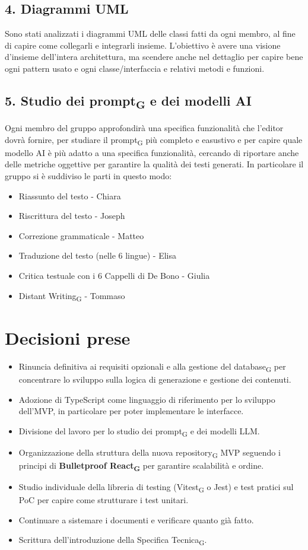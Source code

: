 \documentclass[a4paper,12pt]{article}
\newcommand{\gls}[1]{#1\textsubscript{G}}
\begin{document}
\subsection*{4. Diagrammi UML}
Sono stati analizzati i diagrammi UML delle classi fatti da ogni membro, al fine di capire come collegarli e integrarli insieme. L'obiettivo è avere una visione d'insieme dell'intera architettura, ma scendere anche nel dettaglio per capire bene ogni pattern usato e ogni classe/interfaccia e relativi metodi e funzioni.

\subsection*{5. Studio dei \gls{prompt} e dei modelli AI}
Ogni membro del gruppo approfondirà una specifica funzionalità che l'editor dovrà fornire, per studiare il \gls{prompt} più completo e easustivo e per capire quale modello AI è più adatto a una specifica funzionalità, cercando di riportare anche delle metriche oggettive per garantire la qualità dei testi generati. In particolare il gruppo si è suddiviso le parti in questo modo:
\begin{itemize}
    \item Riassunto del testo - Chiara
    \item Riscrittura del testo - Joseph
    \item Correzione grammaticale - Matteo
    \item Traduzione del testo (nelle 6 lingue) - Elisa
    \item Critica testuale con i 6 Cappelli di De Bono - Giulia
    \item \gls{Distant Writing} - Tommaso
\end{itemize}


\section*{Decisioni prese}
\begin{itemize}
    \item Rinuncia definitiva ai requisiti opzionali e alla gestione del \gls{database} per concentrare lo sviluppo sulla logica di generazione e gestione dei contenuti.
    \item Adozione di TypeScript come linguaggio di riferimento per lo sviluppo dell'MVP, in particolare per poter implementare le interfacce.
    \item Divisione del lavoro per lo studio dei \gls{prompt} e dei modelli LLM.
    \item Organizzazione della struttura della nuova \gls{repository} MVP seguendo i principi di \textbf{Bulletproof \gls{React}} per garantire scalabilità e ordine.
    \item Studio individuale della libreria di testing (\gls{Vitest} o Jest) e test pratici sul PoC per capire come strutturare i test unitari.
    \item Continuare a sistemare i documenti e verificare quanto già fatto.
    \item Scrittura dell'introduzione della \gls{Specifica Tecnica}.
\end{itemize}
\end{document}
